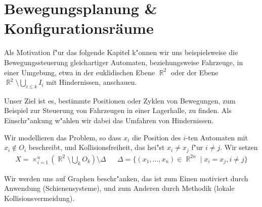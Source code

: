 \documentclass[paper=A4, twoside, chapterprefix=true, bibliography=totoc, headsepline]{scrbook}
\newcommand{\tikzgitter}[3][0.25]{ %
	\draw[step=#1,gray!15] #2 grid #3;
	\draw[step=2*#1,gray!30] #2 grid #3;
	\fill (0,0) circle(0.1); 
}
\DeclareMathOperator{\R}{\mathbb{R}}
\theoremstyle{nonumberbreak}
\theoremstyle{emptybreak}
\theoremstyle{break}
\begin{document}

\chapter{Bewegungsplanung \& Konfigurationsr\"aume}

Als Motivation f"ur das folgende Kapitel k"onnen wir uns beispielsweise die Bewegungssteuerung gleichartiger Automaten, beziehungsweise Fahrzeuge, in einer Umgebung, etwa in der euklidischen Ebene $\R^2$ oder der Ebene $\R^2 \setminus \bigcup_{i \le k} I_i$ mit Hindernissen, anschauen.

Unser Ziel ist es, bestimmte Positionen oder Zyklen von Bewegungen, zum Beispiel zur Steuerung von Fahrzeugen in einer Lagerhalle, zu finden.
Als Einschr"ankung w"ahlen wir dabei das Umfahren von Hindernissen.

Wir modellieren das Problem, so dass $x_i$ die Position des $i$-ten Automaten mit $x_i \notin O_i$ beschreibt, und Kollisionsfreiheit, das hei"st $x_i \ne x_j$ f"ur $i \ne j$.
Wir setzen
\begin{align*}
	X = \times_{i=1}^{n} (\R^2 \setminus \bigcup_k O_k ) \setminus \Delta && \Delta = \{(x_1, \ldots, x_n) \in \R^{2n} \mid x_i = x_j, i \ne j \}
\end{align*}

Wir werden uns auf Graphen beschr"anken, das ist zum Einen motiviert durch Anwendung (Schienensysteme), und zum Anderen durch Methodik (lokale Kollisionsvermeidung).
\end{document}
